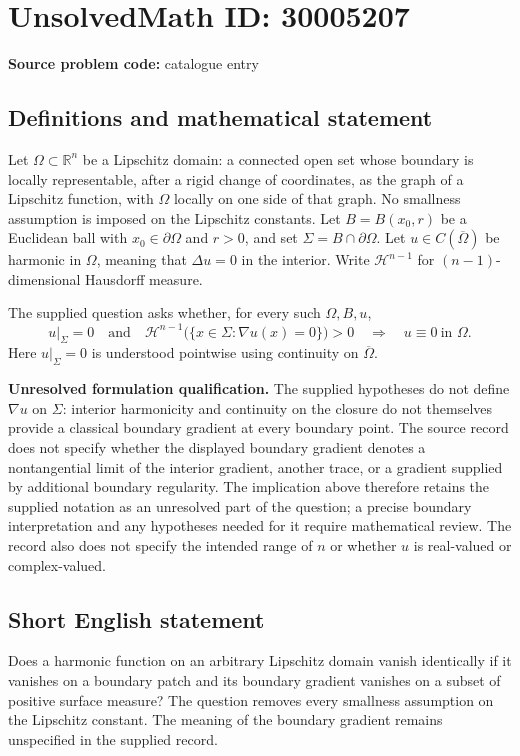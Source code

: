 \documentclass[11pt]{article}
\newcommand{\R}{\mathbb{R}}
\begin{document}
\section*{UnsolvedMath ID: 30005207}
\textbf{Source problem code:} catalogue entry
\subsection{Definitions and mathematical statement}
Let \(\Omega\subset\R^n\) be a Lipschitz domain: a connected open set whose boundary is locally representable, after a rigid change of coordinates, as the graph of a Lipschitz function, with \(\Omega\) locally on one side of that graph. No smallness assumption is imposed on the Lipschitz constants. Let \(B=B(x_0,r)\) be a Euclidean ball with \(x_0\in\partial\Omega\) and \(r>0\), and set \(\Sigma=B\cap\partial\Omega\). Let \(u\in C(\overline\Omega)\) be harmonic in \(\Omega\), meaning that \(\Delta u=0\) in the interior. Write \(\mathcal H^{n-1}\) for \((n-1)\)-dimensional Hausdorff measure.

The supplied question asks whether, for every such \(\Omega,B,u\),
\[
 u|_{\Sigma}=0
 \quad\text{and}\quad
 \mathcal H^{n-1}\bigl(\{x\in\Sigma:\nabla u(x)=0\}\bigr)>0
 \quad\Longrightarrow\quad
 u\equiv0\ \text{in }\Omega.
\]
Here \(u|_{\Sigma}=0\) is understood pointwise using continuity on \(\overline\Omega\).

\textbf{Unresolved formulation qualification.} The supplied hypotheses do not define \(\nabla u\) on \(\Sigma\): interior harmonicity and continuity on the closure do not themselves provide a classical boundary gradient at every boundary point. The source record does not specify whether the displayed boundary gradient denotes a nontangential limit of the interior gradient, another trace, or a gradient supplied by additional boundary regularity. The implication above therefore retains the supplied notation as an unresolved part of the question; a precise boundary interpretation and any hypotheses needed for it require mathematical review. The record also does not specify the intended range of \(n\) or whether \(u\) is real-valued or complex-valued.
\subsection{Short English statement}
Does a harmonic function on an arbitrary Lipschitz domain vanish identically if it vanishes on a boundary patch and its boundary gradient vanishes on a subset of positive surface measure? The question removes every smallness assumption on the Lipschitz constant. The meaning of the boundary gradient remains unspecified in the supplied record.
\end{document}
